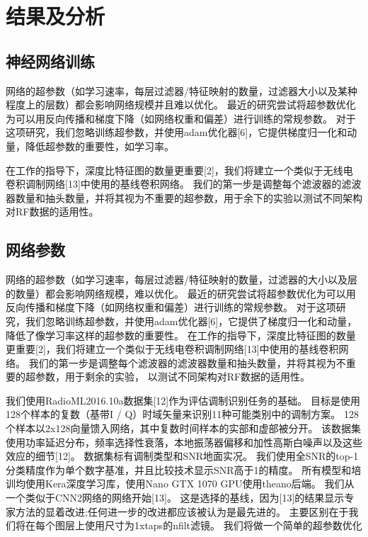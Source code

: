 \section{结果及分析}

\subsection{神经网络训练}

网络的超参数（如学习速率，每层过滤器/特征映射的数量，过滤器大小以及某种程度上的层数）都会影响网络规模并且难以优化。 最近的研究尝试将超参数优化为可以用反向传播和梯度下降（如网络权重和偏差）进行训练的常规参数。 对于这项研究，我们忽略训练超参数，并使用adam优化器[6]，它提供梯度归一化和动量，降低超参数的重要性，如学习率。

在工作的指导下，深度比特征图的数量更重要[2]，我们将建立一个类似于无线电卷积调制网络[13]中使用的基线卷积网络。 我们的第一步是调整每个滤波器的滤波器数量和抽头数量，并将其视为不重要的超参数，用于余下的实验以测试不同架构对RF数据的适用性。

\subsection{网络参数}

网络的超参数（如学习速率，每层过滤器/特征映射的数量，过滤器的大小以及层的数量）都会影响网络规模，难以优化。
最近的研究尝试将超参数优化为可以用反向传播和梯度下降（如网络权重和偏差）进行训练的常规参数。
对于这项研究，我们忽略训练超参数，并使用adam优化器[6]，它提供了梯度归一化和动量，降低了像学习率这样的超参数的重要性。
在工作的指导下，深度比特征图的数量更重要[2]，我们将建立一个类似于无线电卷积调制网络[13]中使用的基线卷积网络。
我们的第一步是调整每个滤波器的滤波器数量和抽头数量，并将其视为不重要的超参数，用于剩余的实验，
以测试不同架构对RF数据的适用性。\par

我们使用RadioML2016.10a数据集[12]作为评估调制识别任务的基础。
目标是使用128个样本的复数（基带I / Q）时域矢量来识别11种可能类别中的调制方案。 
128个样本以2x128向量馈入网络，其中复数时间样本的实部和虚部被分开。
该数据集使用功率延迟分布，频率选择性衰落，本地振荡器偏移和加性高斯白噪声以及这些效应的细节[12]。
数据集标有调制类型和SNR地面实况。
我们使用全SNR的top-1分类精度作为单个数字基准，并且比较技术显示SNR高于1的精度。
所有模型和培训均使用Kera深度学习库，使用Nano GTX 1070 GPU使用theano后端。
我们从一个类似于CNN2网络的网络开始[13]。
这是选择的基线，因为[13]的结果显示专家方法的显着改进;任何进一步的改进都应该被认为是最先进的。
主要区别在于我们将在每个图层上使用尺寸为1xtaps的nfilt滤镜。
我们将做一个简单的超参数优化\par

